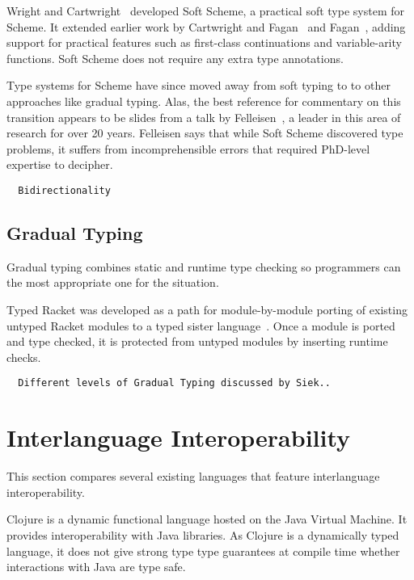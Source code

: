 Wright and Cartwright~\cite{WC97} developed Soft Scheme, a practical
soft type system for Scheme. 
It extended earlier work by Cartwright and Fagan~\cite{CF91}
and Fagan~\cite{Fag91}, adding support for practical features such as
first-class continuations and variable-arity functions.
Soft Scheme does not require any extra type annotations.

Type systems for Scheme have since moved away from soft typing
to to other approaches like gradual typing.
Alas, the best reference for commentary on this transition 
appears to be slides from a talk by Felleisen~\cite{Fell09},
a leader in this area of research for over 20 years.
Felleisen says that while Soft Scheme discovered type problems, 
it suffers from incomprehensible
errors that required PhD-level expertise to decipher. 

\begin{verbatim}
  Bidirectionality
\end{verbatim}

\subsection{Gradual Typing}

Gradual typing combines static and runtime type checking so programmers
can the most appropriate one for the situation.

Typed Racket was developed as a path for module-by-module
porting of existing untyped Racket modules to a typed sister language~\cite{Tob10}.
Once a module is ported and type checked, it is protected from untyped modules
by inserting runtime checks.

\begin{verbatim}
  Different levels of Gradual Typing discussed by Siek..
\end{verbatim}

\section{Interlanguage Interoperability}

This section compares several existing languages that feature interlanguage interoperability.

Clojure is a dynamic functional language hosted on the Java Virtual Machine. It provides 
interoperability with Java libraries. As Clojure is a dynamically typed language, it does
not give strong type type guarantees at compile time whether interactions with Java
are type safe.

